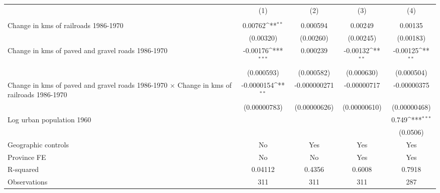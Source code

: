 {
\def\sym#1{\ifmmode^{#1}\else\(^{#1}\)\fi}
\begin{tabular}{l*{4}{c}}
\hline\hline
                &\multicolumn{1}{c}{(1)}&\multicolumn{1}{c}{(2)}&\multicolumn{1}{c}{(3)}&\multicolumn{1}{c}{(4)}\\
                &\multicolumn{1}{c}{}&\multicolumn{1}{c}{}&\multicolumn{1}{c}{}&\multicolumn{1}{c}{}\\
\hline
Change in kms of railroads 1986-1970&  0.00762\sym{**} & 0.000594         &  0.00249         &  0.00135         \\
                &(0.00320)         &(0.00260)         &(0.00245)         &(0.00183)         \\
[1em]
Change in kms of paved and gravel roads 1986-1970& -0.00176\sym{***}& 0.000239         & -0.00132\sym{**} & -0.00125\sym{**} \\
                &(0.000593)         &(0.000582)         &(0.000630)         &(0.000504)         \\
[1em]
Change in kms of paved and gravel roads 1986-1970 $\times$ Change in kms of railroads 1986-1970&-0.0000154\sym{**} &-0.000000271         &-0.00000717         &-0.00000375         \\
                &(0.00000783)         &(0.00000626)         &(0.00000610)         &(0.00000468)         \\
[1em]
Log urban population 1960&                  &                  &                  &    0.749\sym{***}\\
                &                  &                  &                  & (0.0506)         \\
\hline
Geographic controls&       No         &      Yes         &      Yes         &      Yes         \\
Province FE     &       No         &       No         &      Yes         &      Yes         \\
R-squared       &  0.04112         &   0.4356         &   0.6008         &   0.7918         \\
Observations    &      311         &      311         &      311         &      287         \\
\hline\hline
\end{tabular}
}
